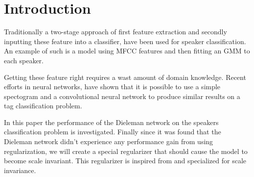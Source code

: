 \section{Introduction}

Traditionally a two-stage approach of first feature extraction and secondly inputting these feature into a classifier, have been used for speaker classification. An example of such is a model using MFCC features and then fitting an GMM to each speaker.

Getting these feature right requires a wast amount of domain knowledge. Recent efforts \cite{dieleman} in neural networks, have shown that it is possible to use a simple spectogram and a convolutional neural network to produce similar results on a tag classification problem.

In this paper the performance of the Dieleman \cite{dieleman} network on the speakers classification problem is investigated. Finally since it was found that the Dieleman network didn't experience any performance gain from using regularization\cite{dieleman}, we will create a special regularizer that should cause the model to become scale invariant. This regularizer is inspired from \cite{scale-invariante} and specialized for scale invariance.
